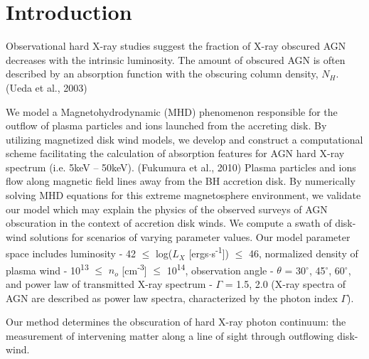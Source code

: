 \documentclass[12pt,linenumbers]{aastex631}
\begin{document}
\vspace{10pt}
\section{Introduction} \label{sec:intro}
Observational hard X-ray studies suggest the fraction of X-ray obscured AGN decreases with the intrinsic luminosity. The amount of obscured AGN is often described by an absorption function with the obscuring column density, $N_H$.  (Ueda et al., 2003)  \par
We model a Magnetohydrodynamic (MHD) phenomenon responsible for the outflow of plasma particles and ions launched from the accreting disk.  By utilizing magnetized disk wind models, we develop and construct a computational scheme facilitating the calculation of absorption features for AGN hard X-ray spectrum (i.e.  5keV – 50keV).  (Fukumura et al., 2010) Plasma particles and ions flow along magnetic field lines away from the BH accretion disk.  By numerically solving MHD equations for this extreme magnetosphere environment, we validate our model which may explain the physics of the observed surveys of AGN obscuration in the context of accretion disk winds.  We compute a swath of disk-wind solutions for scenarios of varying parameter values.  Our model parameter space includes luminosity - 42 $\leq$ log($L_X$ [ergs$\cdot$s\textsuperscript{-1}]) $\leq$ 46, normalized density of plasma wind - 10\textsuperscript{13} $\leq$ $n_o$ [cm\textsuperscript{-3}] $\leq$ 10\textsuperscript{14}, observation angle - $\theta$ = 30$^{\circ}$, 45$^{\circ}$, 60$^{\circ}$, and power law of transmitted X-ray spectrum - $\Gamma$ = 1.5, 2.0 (X-ray spectra of AGN are described as power law spectra, characterized by the photon index $\Gamma$).
\par
Our method determines the obscuration of hard X-ray photon continuum: the measurement of intervening matter along a line of sight through outflowing disk-wind.  
\hfill
\newpage
\end{document}
